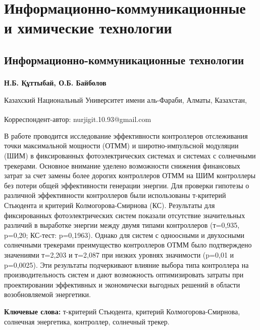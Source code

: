 \newpage
\let\cleardoublepage\clearpage
\part{Информационно-коммуникационные и химические технологии}
\chapter{Информационно-коммуникационные технологии}

\begin{articleheader}

{\bfseries
Н.Б. Құттыбай\textsuperscript{\envelope },
О.Б. Байболов
}
\end{articleheader}

\begin{affiliation}
Казахский Национальный Университет имени аль-Фараби, Алматы, Казахстан,

\raggedright \textsuperscript{\envelope }Корреспондент-автор: nurjigit.10.93@gmail.com
\end{affiliation}

В работе проводится исследование эффективности контроллеров отслеживания
точки максимальной мощности (ОТММ) и широтно-импульсной модуляции (ШИМ)
в фиксированных фотоэлектрических системах и системах с солнечными
трекерами. Основное внимание уделено возможности снижения финансовых
затрат за счет замены более дорогих контроллеров ОТММ на ШИМ контроллеры
без потери общей эффективности генерации энергии. Для проверки гипотезы
о различной эффективности контроллеров были использованы т-критерий
Стьюдента и критерий Колмогорова-Смирнова (КС). Результаты для
фиксированных фотоэлектрических систем показали отсутствие значительных
различий в выработке энергии между двумя типами контроллеров (т=0,935,
p=0,20; КС-тест: p=0,1963). Однако для систем с одноосными и двухосными
солнечными трекерами преимущество контроллеров ОТММ было подтверждено
значениями т=2,203 и т=2,087 при низких уровнях значимости (p=0,01 и
p=0,0025). Эти результаты подчеркивают влияние выбора типа контроллера
на производительность систем и дают возможность оптимизировать затраты
при проектировании эффективных и экономически выгодных решений в области
возобновляемой энергетики.

{\bfseries Ключевые слова:} т-критерий Стьюдента, критерий
Колмогорова-Смирнова, солнечная энергетика, контроллер, солнечный
трекер.

